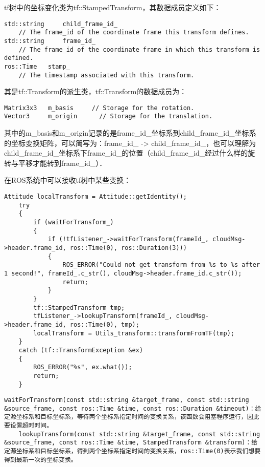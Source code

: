 \documentclass[UTF8]{ctexart}
\begin{document}
tf树中的坐标变化类为tf::StampedTransform，其数据成员定义如下：

\begin{lstlisting}[caption={}]
std::string 	child_frame_id_
 	// The frame_id of the coordinate frame this transform defines.
std::string 	frame_id_
 	// The frame_id of the coordinate frame in which this transform is defined.
ros::Time 	stamp_
 	// The timestamp associated with this transform.
\end{lstlisting}

其是tf::Transform的派生类，tf::Transform的数据成员为：

\begin{lstlisting}[caption={}]
Matrix3x3 	m_basis		// Storage for the rotation.
Vector3 	m_origin	  // Storage for the translation.
\end{lstlisting}

其中的m_basis和m_origin记录的是frame_id_坐标系到child_frame_id_坐标系的坐标变换矩阵，可以简写为：frame_id_ -> child_frame_id_，也可以理解为child_frame_id_坐标系下frame_id_的位置（child_frame_id_经过什么样的旋转与平移才能转到frame_id_）．

在ROS系统中可以接收tf树中某些变换：

\begin{lstlisting}[caption={}]
	Attitude localTransform = Attitude::getIdentity();
	try
	{
		if (waitForTransform_)
		{
			if (!tfListener_->waitForTransform(frameId_, cloudMsg->header.frame_id, ros::Time(0), ros::Duration(3)))
			{
				ROS_ERROR("Could not get transform from %s to %s after 1 second!", frameId_.c_str(), cloudMsg->header.frame_id.c_str());
				return;
			}
		}
		tf::StampedTransform tmp;
		tfListener_->lookupTransform(frameId_, cloudMsg->header.frame_id, ros::Time(0), tmp);
		localTransform = Utils_transform::transformFromTF(tmp);
	}
	catch (tf::TransformException &ex)
	{
		ROS_ERROR("%s", ex.what());
		return;
	}
	\end{lstlisting}


\begin{lstlisting}[caption={}]
	waitForTransform(const std::string &target_frame, const std::string &source_frame, const ros::Time &time, const ros::Duration &timeout)：给定源坐标系和目标坐标系，等待两个坐标系指定时间的变换关系，该函数会阻塞程序运行，因此要设置超时时间。
	lookupTransform(const std::string &target_frame, const std::string &source_frame, const ros::Time &time, StampedTransform &transform)：给定源坐标系和目标坐标系，得到两个坐标系指定时间的变换关系，ros::Time(0)表示我们想要得到最新一次的坐标变换。
\end{lstlisting}
\end{document}
